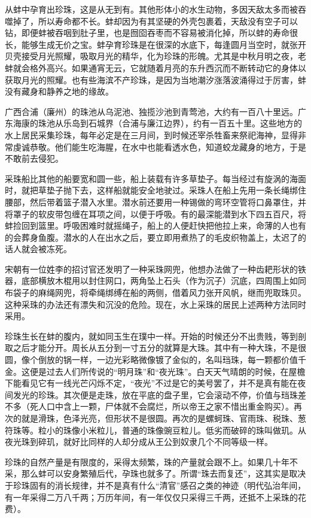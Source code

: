 \documentclass[12pt,UTF8]{ctexbook}
\begin{document}
从蚌中孕育出珍珠，这是从无到有。其他形体小的水生动物，多因天敌太多而被吞噬掉了，所以寿命都不长。蚌却因为有其坚硬的外壳包裹着，天敌没有空子可以钻，即便蚌被吞咽到肚子里，也是囫囵吞枣而不容易被消化掉，所以蚌的寿命很长，能够生成无价之宝。蚌孕育珍珠是在很深的水底下，每逢圆月当空时，就张开贝壳接受月光照耀，吸取月光的精华，化为珍珠的形魄。尤其是中秋月明之夜，老蚌就会格外高兴。如果通宵无云，它就随着月亮的东升西沉而不断转动它的身体以获取月光的照耀。也有些海滨不产珍珠，是因为当地潮汐涨落波涌得过于厉害，蚌没有藏身和静养之地的缘故。

广西合浦（廉州）的珠池从乌泥池、独揽沙池到青莺池，大约有一百八十里远。广东海康的珠池从乐岛到石城界（合浦与廉江边界），约有一百五十里。这些地方的水上居民采集珍珠，每年必定是在三月间，到时候还宰杀牲畜来祭祀海神，显得非常虔诚恭敬。他们能生吃海腥，在水中也能看透水色，知道蛟龙藏身的地方，于是不敢前去侵犯。

采珠船比其他的船要宽和圆一些，船上装载有许多草垫子。每当经过有旋涡的海面时，就把草垫子抛下去，这样船就能安全地驶过。采珠人在船上先用一条长绳绑住腰部，然后带着篮子潜入水里。潜水前还要用一种锡做的弯环空管将口鼻罩住，并将罩子的软皮带包缠在耳项之间，以便于呼吸。有的最深能潜到水下四五百尺，将蚌捡回到篮里。呼吸困难时就摇绳子，船上的人便赶快把他拉上来，命薄的人也有的会葬身鱼腹。潜水的人在出水之后，要立即用煮热了的毛皮织物盖上，太迟了的话人就会被冻死。

宋朝有一位姓李的招讨官还发明了一种采珠网兜，他想办法做了一种齿耙形状的铁器，底部横放木棍用以封住网口，两角坠上石头（作为沉子）沉底，四周围上如同布袋子的麻绳网兜，将牵绳绑缚在船的两侧，借着风力张开风帆，继而兜取珠贝。这种采珠的办法还有漂失和沉没的危险。现在，水上采珠的居民上述两种方法同时采用。

珍珠生长在蚌的腹内，就如同玉生在璞中一样。开始的时候还分不出贵贱，等到剖取之后才能分开。周长从五分到一寸五分的就算是大珠。其中有一种大珠，不是很圆，像个倒放的锅一样，一边光彩略微像镀了金似的，名叫珰珠，每一颗都价值千金。这便是过去人们所传说的“明月珠”和“夜光珠”。白天天气晴朗的时候，在屋檐下能看见它有一线光芒闪烁不定，“夜光”不过是它的美号罢了，并不是真有能在夜间发光的珍珠。其次便是走珠，放在平底的盘子里，它会滚动不停，价值与珰珠差不多（死人口中含上一颗，尸体就不会腐烂，所以帝王之家不惜出重金购买）。再次的就是滑珠，色泽光亮，但形状不是很圆。再次的是螺蚵珠、官雨珠、税珠、葱符珠等。粒小的珠像小米粒儿，普通的珠像豌豆粒儿。低劣而破碎的珠叫做玑。从夜光珠到碎玑，就好比同样的人却分成从王公到奴隶几个不同等级一样。

珍珠的自然产量是有限度的，采得太频繁，珠的产量就会跟不上。如果几十年不采，那么蚌可以安身繁殖后代，孕珠也就多了。所谓“珠去而复还”，这其实是取决于珍珠固有的消长规律，并不是真有什么“清官”感召之类的神迹（明代弘治年间，有一年采得二万八千两；万历年间，有一年仅仅只采得三千两，还抵不上采珠的花费）。
\end{document}
